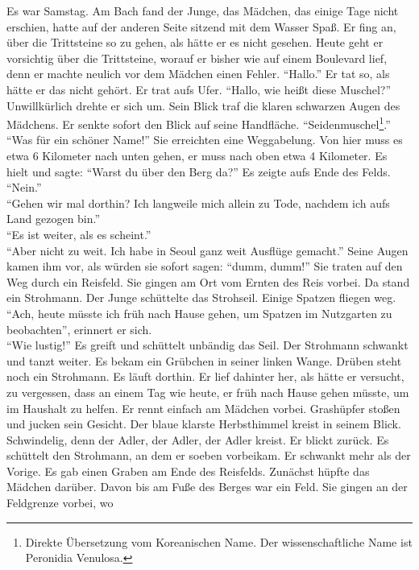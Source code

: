\documentclass[prd,12pt,tightenlines,notitlepage,nofootinbib]{revtex4-1}
\begin{document}
Es war Samstag.  Am Bach fand der Junge, das Mädchen, das einige
Tage nicht erschien, hatte auf der anderen Seite sitzend mit dem Wasser
Spaß.  Er fing an, über die Trittsteine so zu gehen, als hätte er es
nicht gesehen.  Heute geht er vorsichtig über die Trittsteine, worauf
er bisher wie auf einem Boulevard lief, denn er machte neulich vor dem
Mädchen einen Fehler.  "`Hallo."'  Er tat so, als hätte er das nicht
gehört.  Er trat aufs Ufer.  "`Hallo, wie heißt diese Muschel?"'
Unwillkürlich drehte er sich um.  Sein Blick traf die klaren schwarzen
Augen des Mädchens.  Er senkte sofort den Blick auf seine Handfläche.
"`Seidenmuschel\footnote{Direkte Übersetzung vom Koreanischen Name.
  Der wissenschaftliche Name ist Peronidia Venulosa.}."'\\
"`Was für ein schöner Name!"'  Sie erreichten eine Weggabelung.
Von hier muss es etwa 6 Kilometer nach unten gehen, er muss
nach oben etwa 4 Kilometer.  Es hielt und sagte: "`Warst du über den
Berg da?"'  Es zeigte aufs Ende des Felds.\\
"`Nein."'\\
"`Gehen wir mal dorthin?
Ich langweile mich allein zu Tode, nachdem ich aufs Land
gezogen bin."'\\
"`Es ist weiter, als es scheint."'\\
"`Aber nicht zu weit.
Ich habe in Seoul ganz weit Ausflüge gemacht."'  Seine Augen kamen ihm
vor, als würden sie sofort sagen: "`dumm, dumm!"'  Sie traten auf den Weg
durch ein Reisfeld.  Sie gingen am Ort vom Ernten des Reis vorbei.
Da stand ein Strohmann.  Der Junge schüttelte das Strohseil.  Einige
Spatzen fliegen weg.  "`Ach, heute müsste ich früh nach Hause gehen, um
Spatzen im Nutzgarten zu beobachten"', erinnert er sich.\\
"`Wie lustig!"'
Es greift und schüttelt unbändig das Seil.  Der Strohmann schwankt und
tanzt weiter.  Es bekam ein Grübchen in seiner linken Wange.  Drüben
steht noch ein Strohmann.  Es läuft dorthin.  Er lief dahinter her,
als hätte er versucht, zu vergessen, dass an einem Tag wie heute, er
früh nach Hause gehen müsste, um im Haushalt zu helfen.  Er rennt
einfach am Mädchen vorbei.  Grashüpfer stoßen und jucken sein
Gesicht.  Der blaue klarste Herbsthimmel kreist in seinem Blick.
Schwindelig, denn der Adler, der Adler, der Adler kreist.  Er blickt
zurück.  Es schüttelt den Strohmann, an dem er soeben vorbeikam.  Er
schwankt mehr als der Vorige.  Es gab einen Graben am Ende des
Reisfelds.  Zunächst hüpfte das Mädchen darüber.  Davon bis am Fuße
des Berges war ein Feld.  Sie gingen an der Feldgrenze vorbei, wo
\end{document}

